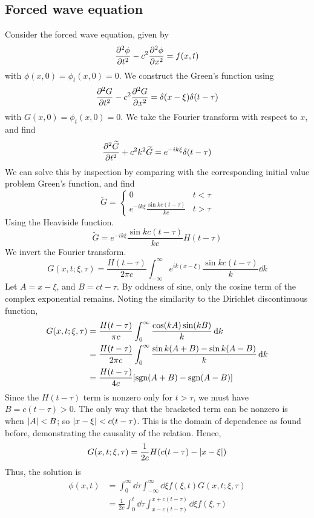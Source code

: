\subsection{Forced wave equation}
Consider the forced wave equation, given by
\[
	\pdv[2]{\phi}{t} - c^2 \pdv[2]{\phi}{x} = f(x,t)
\]
with \( \phi(x,0) = \phi_t(x,0) = 0 \).
We construct the Green's function using
\[
	\pdv[2]{G}{t} - c^2 \pdv[2]{G}{x} = \delta(x-\xi)\delta(t-\tau)
\]
with \( G(x,0) = \phi_t(x,0) = 0 \).
We take the Fourier transform with respect to \( x \), and find
\[
	\pdv[2]{\widetilde G}{t} + c^2 k^2 \widetilde G = e^{-ik\xi} \delta(t - \tau)
\]
We can solve this by inspection by comparing with the corresponding initial value problem Green's function, and find
\[
	\widetilde G = \begin{cases}
		0                                       & t < \tau \\
		e^{-ik\xi} \frac{\sin kc(t - \tau)}{kc} & t > \tau
	\end{cases}
\]
Using the Heaviside function.
\[
	\widetilde G = e^{-ik\xi} \frac{\sin kc(t - \tau)}{kc} H(t - \tau)
\]
We invert the Fourier transform.
\[
	G(x,t;\xi,\tau) = \frac{H(t-\tau)}{2\pi c} \int_{-\infty}^\infty e^{ik(x - \xi)} \frac{\sin kc(t - \tau)}{k} \dd{k}
\]
Let \( A = x - \xi \), and \( B = ct - \tau \).
By oddness of sine, only the cosine term of the complex exponential remains.
Noting the similarity to the Dirichlet discontinuous function,
\begin{align*}
	G(x,t;\xi,\tau) & = \frac{H(t-\tau)}{\pi c} \int_0^\infty \frac{\cos(kA) \sin(kB)}{k} \dd{k}          \\
	                & = \frac{H(t-\tau)}{2\pi c} \int_0^\infty \frac{\sin k(A+B) - \sin k(A-B)}{k} \dd{k} \\
	                & = \frac{H(t-\tau)}{4c} \qty[ \operatorname{sgn}(A+B) - \operatorname{sgn}(A-B) ]
\end{align*}
Since the \( H(t - \tau) \) term is nonzero only for \( t > \tau \), we must have \( B = c(t-\tau) > 0 \).
The only way that the bracketed term can be nonzero is when \( \abs{A} < B \); so \( \abs{x - \xi} < c(t-\tau) \).
This is the domain of dependence as found before, demonstrating the causality of the relation.
Hence,
\[
	G(x,t;\xi,\tau) = \frac{1}{2c} H(c(t-\tau) - \abs{x - \xi})
\]
Thus, the solution is
\begin{align*}
	\phi(x,t) & = \int_0^\infty \dd{\tau} \int_{-\infty}^\infty \dd{\xi} f(\xi, t) G(x,t;\xi,\tau)             \\
	          & = \frac{1}{2c} \int_0^t \dd{\tau} \int_{x - c(t-\tau)}^{x + c(t - \tau)} \dd{\xi} f(\xi, \tau)
\end{align*}

